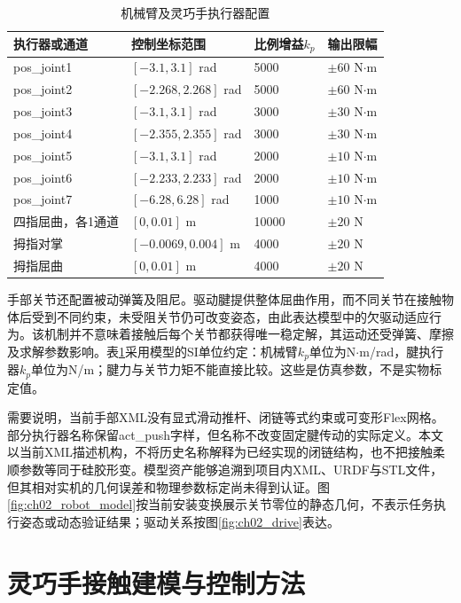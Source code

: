 \begin{table}[htbp]
  \centering\small
  \caption{机械臂及灵巧手执行器配置}
  \label{tab:ch02_actuators}
  \begin{tabular}{p{}p{}p{}p{}}
    \hline
    执行器或通道 & 控制坐标范围 & 比例增益$k_p$ & 输出限幅\\
    \hline
    pos\_joint1 & $[-3.1,3.1]$ rad & 5000 & $\pm60$ N$\cdot$m\\
    pos\_joint2 & $[-2.268,2.268]$ rad & 5000 & $\pm60$ N$\cdot$m\\
    pos\_joint3 & $[-3.1,3.1]$ rad & 3000 & $\pm30$ N$\cdot$m\\
    pos\_joint4 & $[-2.355,2.355]$ rad & 3000 & $\pm30$ N$\cdot$m\\
    pos\_joint5 & $[-3.1,3.1]$ rad & 2000 & $\pm10$ N$\cdot$m\\
    pos\_joint6 & $[-2.233,2.233]$ rad & 2000 & $\pm10$ N$\cdot$m\\
    pos\_joint7 & $[-6.28,6.28]$ rad & 1000 & $\pm10$ N$\cdot$m\\
    四指屈曲，各1通道 & $[0,0.01]$ m & 10000 & $\pm20$ N\\
    拇指对掌 & $[-0.0069,0.004]$ m & 4000 & $\pm20$ N\\
    拇指屈曲 & $[0,0.01]$ m & 4000 & $\pm20$ N\\
    \hline
  \end{tabular}
\end{table}

手部关节还配置被动弹簧及阻尼。驱动腱提供整体屈曲作用，而不同关节在接触物体后受到不同约束，未受阻关节仍可改变姿态，由此表达模型中的欠驱动适应行为。该机制并不意味着接触后每个关节都获得唯一稳定解，其运动还受弹簧、摩擦及求解参数影响。表\ref{tab:ch02_actuators}采用模型的SI单位约定：机械臂$k_p$单位为N$\cdot$m/rad，腱执行器$k_p$单位为N/m；腱力与关节力矩不能直接比较。这些是仿真参数，不是实物标定值。

需要说明，当前手部XML没有显式滑动推杆、闭链等式约束或可变形Flex网格。部分执行器名称保留act\_push字样，但名称不改变固定腱传动的实际定义。本文以当前XML描述机构，不将历史名称解释为已经实现的闭链结构，也不把接触柔顺参数等同于硅胶形变。模型资产能够追溯到项目内XML、URDF与STL文件，但其相对实机的几何误差和物理参数标定尚未得到认证。图\ref{fig:ch02_robot_model}按当前安装变换展示关节零位的静态几何，不表示任务执行姿态或动态验证结果；驱动关系按图\ref{fig:ch02_drive}表达。

\section{灵巧手接触建模与控制方法}
\label{sec:contact_control}

